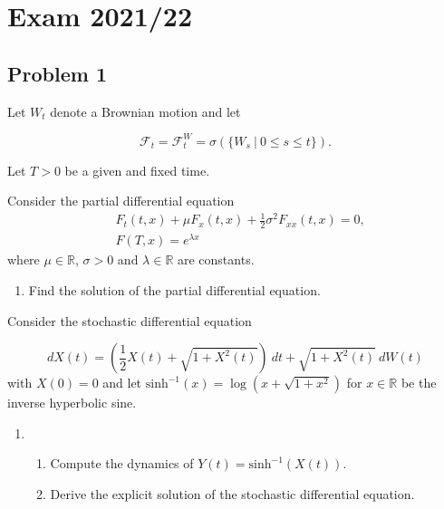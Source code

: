 \documentclass[a4paper,12pt,openany]{book}
\providecommand{\tightlist}{%
 \setlength{\itemsep}{0pt}\setlength{\parskip}{0pt}}
\begin{document}
\noindent\makebox[\linewidth]{\rule{\textwidth}{0.4pt}}
\pagebreak

\hypertarget{exam-202122}{%
\section{Exam 2021/22}\label{exam-202122}}

\hypertarget{problem-1-4}{%
\subsection{Problem 1}\label{problem-1-4}}

Let \(W_t\) denote a Brownian motion and let

\[
\mathcal{F}_t=\mathcal{F}_t^W=\sigma(\{W_s\ \vert\ 0\le s\le t\}).
\]

Let \(T>0\) be a given and fixed time.

Consider the partial differential equation
\begin{align*}
&F_t(t,x)+\mu F_x(t,x)+\frac{1}{2}\sigma^2 F_{xx}(t,x)=0,\\
&F(T,x)=e^{\lambda x}
\end{align*}
where \(\mu\in\mathbb{R}\), \(\sigma>0\) and \(\lambda \in \mathbb{R}\) are constants.

\begin{enumerate}
\def\labelenumi{\alph{enumi}.}
\tightlist
\item
  Find the solution of the partial differential equation.
\end{enumerate}

Consider the stochastic differential equation

\[
dX(t)=\left(\frac{1}{2}X(t)+\sqrt{1+X^2(t)}\right)\ dt+\sqrt{1+X^2(t)}\ dW(t)
\]
with \(X(0)=0\) and let \(\text{sinh}^{-1}(x)=\log\left(x+\sqrt{1+x^2}\right)\) for \(x\in\mathbb{R}\) be the inverse hyperbolic sine.

\begin{enumerate}
\def\labelenumi{\alph{enumi}.}
\setcounter{enumi}{1}
\item
  \begin{enumerate}
  \def\labelenumii{\roman{enumii}.}
  \tightlist
  \item
    Compute the dynamics of \(Y(t)=\text{sinh}^{-1}(X(t))\).
  \item
    Derive the explicit solution of the stochastic differential equation.
  \end{enumerate}
\end{enumerate}
\end{document}
